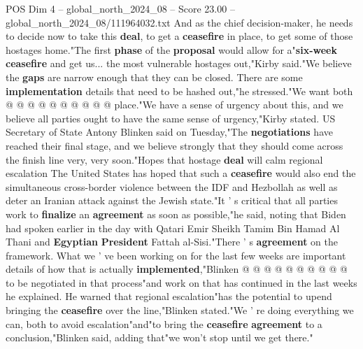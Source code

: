 \begin{textsample}{POS Dim 4 – global\_north\_2024\_08 – Score 23.00 – global\_north\_2024\_08/111964032.txt}
And as the chief decision-maker, he needs to decide now to take this \textbf{deal}, to get a \textbf{ceasefire} in place, to get some of those hostages home."The first \textbf{phase} of the \textbf{proposal} would allow for a"\textbf{six-week} \textbf{ceasefire} and get us... the most vulnerable hostages out,"Kirby said."We believe the \textbf{gaps} are narrow enough that they can be closed.
There are some \textbf{implementation} details that need to be hashed out,"he stressed."We want both @ @ @ @ @ @ @ @ @ @ place."We have a sense of urgency about this, and we believe all parties ought to have the same sense of urgency,"Kirby stated.
US Secretary of State Antony Blinken said on Tuesday,"The \textbf{negotiations} have reached their final stage, and we believe strongly that they should come across the finish line very, very soon."Hopes that hostage \textbf{deal} will calm regional escalation The United States has hoped that such a \textbf{ceasefire} would also end the simultaneous cross-border violence between the IDF and Hezbollah as well as deter an Iranian attack against the Jewish state."It ' s critical that all parties work to \textbf{finalize} an \textbf{agreement} as soon as possible,"he said, noting that Biden had spoken earlier in the day with Qatari Emir Sheikh Tamim Bin Hamad Al Thani and \textbf{Egyptian} \textbf{President} Fattah al-Sisi."There ' s \textbf{agreement} on the framework.
What we ' ve been working on for the last few weeks are important details of how that is actually \textbf{implemented},"Blinken @ @ @ @ @ @ @ @ @ @ to be negotiated in that process"and work on that has continued in the last weeks he explained.
He warned that regional escalation"has the potential to upend bringing the \textbf{ceasefire} over the line,"Blinken stated."We ' re doing everything we can, both to avoid escalation"and"to bring the \textbf{ceasefire} \textbf{agreement} to a conclusion,"Blinken said, adding that"we won't stop until we get there."

\end{textsample}

